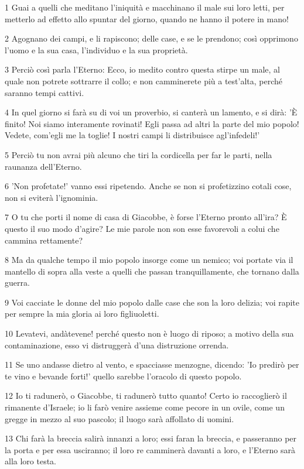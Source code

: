 \par 1 Guai a quelli che meditano l'iniquità e macchinano il male sui loro letti, per metterlo ad effetto allo spuntar del giorno, quando ne hanno il potere in mano!
\par 2 Agognano dei campi, e li rapiscono; delle case, e se le prendono; così opprimono l'uomo e la sua casa, l'individuo e la sua proprietà.
\par 3 Perciò così parla l'Eterno: Ecco, io medito contro questa stirpe un male, al quale non potrete sottrarre il collo; e non camminerete più a test'alta, perché saranno tempi cattivi.
\par 4 In quel giorno si farà su di voi un proverbio, si canterà un lamento, e si dirà: 'È finito! Noi siamo interamente rovinati! Egli passa ad altri la parte del mio popolo! Vedete, com'egli me la toglie! I nostri campi li distribuisce agl'infedeli!'
\par 5 Perciò tu non avrai più alcuno che tiri la cordicella per far le parti, nella raunanza dell'Eterno.
\par 6 'Non profetate!' vanno essi ripetendo. Anche se non si profetizzino cotali cose, non si eviterà l'ignominia.
\par 7 O tu che porti il nome di casa di Giacobbe, è forse l'Eterno pronto all'ira? È questo il suo modo d'agire? Le mie parole non son esse favorevoli a colui che cammina rettamente?
\par 8 Ma da qualche tempo il mio popolo insorge come un nemico; voi portate via il mantello di sopra alla veste a quelli che passan tranquillamente, che tornano dalla guerra.
\par 9 Voi cacciate le donne del mio popolo dalle case che son la loro delizia; voi rapite per sempre la mia gloria ai loro figliuoletti.
\par 10 Levatevi, andàtevene! perché questo non è luogo di riposo; a motivo della sua contaminazione, esso vi distruggerà d'una distruzione orrenda.
\par 11 Se uno andasse dietro al vento, e spacciasse menzogne, dicendo: 'Io predirò per te vino e bevande forti!' quello sarebbe l'oracolo di questo popolo.
\par 12 Io ti radunerò, o Giacobbe, ti radunerò tutto quanto! Certo io raccoglierò il rimanente d'Israele; io li farò venire assieme come pecore in un ovile, come un gregge in mezzo al suo pascolo; il luogo sarà affollato di uomini.
\par 13 Chi farà la breccia salirà innanzi a loro; essi faran la breccia, e passeranno per la porta e per essa usciranno; il loro re camminerà davanti a loro, e l'Eterno sarà alla loro testa.


